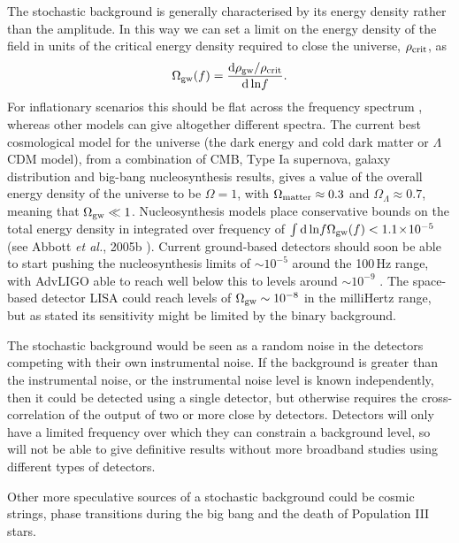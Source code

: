 The stochastic background is generally characterised by its energy density rather than the \gw
amplitude. In this way we can set a limit on the energy density of the \gw field in units of the
critical energy density required to close the universe, $\rho_{\rm crit}$, as
\begin{equation}
\Omega_{\rm gw}(f) = \frac{{\rm d}\rho_{\rm gw}/\rho_{\rm crit}}{{\rm d}\,{\rm ln}f}.
\end{equation}
For inflationary scenarios this should be flat across the frequency spectrum \cite{Schutz:1999},
whereas other models can give altogether different spectra. The current best cosmological model for
the universe (the dark energy and cold dark matter or $\Lambda$CDM model), from a combination of
CMB, Type Ia supernova, galaxy distribution and big-bang nucleosynthesis results, gives a value of
the overall energy density of the universe to be $\Omega = 1$, with $\Omega_{\rm matter} \approx
0.3$ and $\Omega_{\Lambda} \approx 0.7$, meaning that $\Omega_{\rm gw} \ll 1$. Nucleosynthesis
models place conservative bounds on the total energy density in \gws integrated over frequency of
$\int{\rm d}\,{\rm ln}f\Omega_{\rm gw}(f) < 1.1\!\times\!10^{-5}$ (see Abbott {\it et al.}, 2005b
\cite{Abbott2:2005}). Current ground-based detectors should soon be able to start pushing the
nucleosynthesis limits of $\sim 10^{-5}$ around the 100\,Hz range, with AdvLIGO able to reach well
below this to levels around $\sim 10^{-9}$ \cite{Schutz:1999}. The space-based detector LISA could
reach levels of $\Omega_{\rm gw} \sim 10^{-8}$ in the milliHertz range, but as stated its
sensitivity might be limited by the binary background.

The stochastic background would be seen as a random noise in the detectors competing with their
own instrumental noise. If the \gw background is greater than the instrumental noise, or the
instrumental noise level is known independently, then it could be detected using a single detector,
but otherwise requires the cross-correlation of the output of two or more close by detectors.
Detectors will only have a limited frequency over which they can constrain a \gw background level,
so will not be able to give definitive results without more broadband studies using different types
of detectors.

Other more speculative sources of a stochastic background could be cosmic strings, phase transitions
during the big bang and the death of Population III stars.


